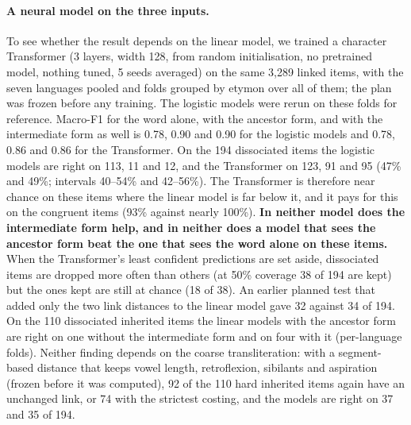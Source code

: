 \documentclass[11pt]{article}
\begin{document}
\paragraph{A neural model on the three inputs.} To see whether the result depends on the linear model, we trained a character Transformer (3 layers, width 128, from random initialisation, no pretrained model, nothing tuned, 5 seeds averaged) on the same 3,289 linked items, with the seven languages pooled and folds grouped by etymon over all of them; the plan was frozen before any training. The logistic models were rerun on these folds for reference. Macro-F1 for the word alone, with the ancestor form, and with the intermediate form as well is 0.78, 0.90 and 0.90 for the logistic models and 0.78, 0.86 and 0.86 for the Transformer. On the 194 dissociated items the logistic models are right on 113, 11 and 12, and the Transformer on 123, 91 and 95 (47\% and 49\%; intervals 40--54\% and 42--56\%). The Transformer is therefore near chance on these items where the linear model is far below it, and it pays for this on the congruent items (93\% against nearly 100\%). \textbf{In neither model does the intermediate form help, and in neither does a model that sees the ancestor form beat the one that sees the word alone on these items.} When the Transformer's least confident predictions are set aside, dissociated items are dropped more often than others (at 50\% coverage 38 of 194 are kept) but the ones kept are still at chance (18 of 38). An earlier planned test that added only the two link distances to the linear model gave 32 against 34 of 194. On the 110 dissociated inherited items the linear models with the ancestor form are right on one without the intermediate form and on four with it (per-language folds). Neither finding depends on the coarse transliteration: with a segment-based distance that keeps vowel length, retroflexion, sibilants and aspiration (frozen before it was computed), 92 of the 110 hard inherited items again have an unchanged link, or 74 with the strictest costing, and the models are right on 37 and 35 of 194.
\end{document}
